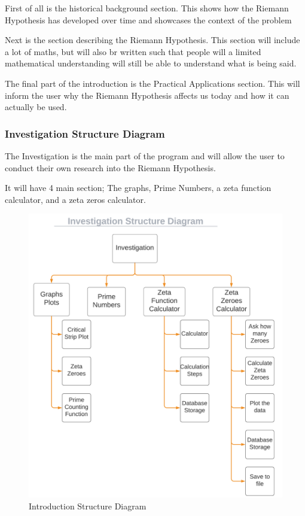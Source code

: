 \documentclass{article}
\begin{document}
First of all is the historical background section. This shows how the Riemann Hypothesis has developed over time and showcases the context of the problem

Next is the section describing the Riemann Hypothesis. This section will include a lot of maths, but will also br written such that people will a limited mathematical understanding will still be able to understand what is being said.

The final part of the introduction is the Practical Applications section. This will inform the user why the Riemann Hypothesis affects us today and how it can actually be used.

\clearpage
\subsubsection{Investigation Structure Diagram}
The Investigation is the main part of the program and will allow the user to conduct their own research into the Riemann Hypothesis.

It will have 4 main section; The graphs, Prime Numbers, a zeta function calculator, and a zeta zeros calculator.

\begin{figure}[h]
    \centering
    \captionsetup{justification=centering}
    \includegraphics[scale=0.5]{investigation-structure-diagram}
    \caption{Introduction Structure Diagram}
\end{figure}
\end{document}
